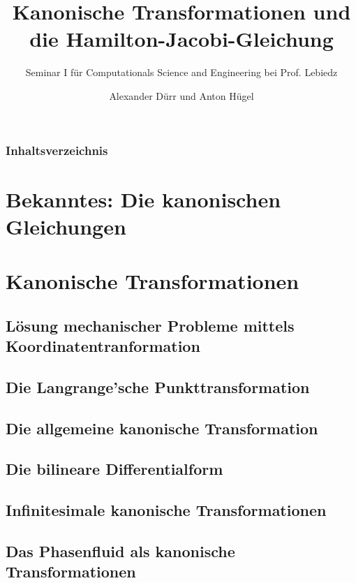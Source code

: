\documentclass{beamer}
\title{Kanonische Transformationen und die Hamilton-Jacobi-Gleichung}
\subtitle{Seminar I für Computationals Science and Engineering bei Prof. Lebiedz}
\author{Alexander Dürr und Anton Hügel}
\institute
{\\Universität Ulm, Institut für Numerische Mathematik}
\begin{document}
\hspace*{-1.49cm}
\frame[plain]{\titlepage}

\hspace*{-0.7cm}
\begin{frame}
  \frametitle{Inhaltsverzeichnis}
  \tableofcontents
\end{frame}


\section{Bekanntes: Die kanonischen Gleichungen}

\section{Kanonische Transformationen}
    

    \subsection{Lösung mechanischer Probleme mittels Koordinatentranformation}
    
    
    \subsection{Die Langrange'sche Punkttransformation}
    
    
    \subsection{Die allgemeine kanonische Transformation}
    
    
    \subsection{Die bilineare Differentialform}
    
    
    \subsection{Infinitesimale kanonische Transformationen}
    
    \subsection{Das Phasenfluid als kanonische Transformationen}
    
\end{document}
